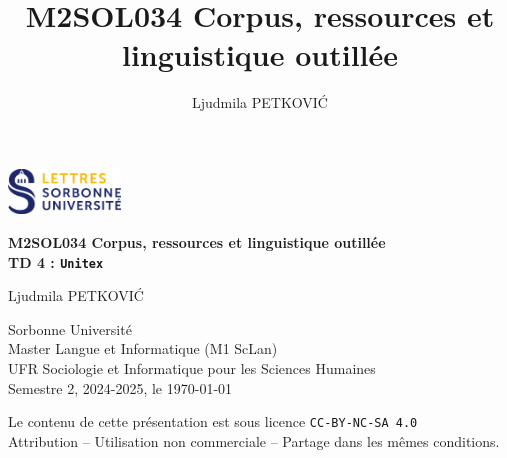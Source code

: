 \documentclass[xcolor={table,usenames,dvipsnames}]{article}
\author{Ljudmila PETKOVI\'C}
\title{\textbf{\textsc{M2SOL034} Corpus, ressources et linguistique outillée}}
\begin{document}
	
	\begin{center}
		\includegraphics[width=3cm]{img/logo.png} %
	\end{center}
	
	\begin{tcolorbox}[colback=myblue!10, colframe=myblue, width=\textwidth, sharp corners, boxrule=1pt]
		\centering
		\Large \textbf{\textsc{M2SOL034} Corpus, ressources et linguistique outillée\\{\large\textsc{TD 4} : \texttt{Unitex}}}
	\end{tcolorbox}
	
	\begin{center}
		Ljudmila PETKOVI\'C
		
		{\small Sorbonne Université\\Master \og{}Langue et Informatique\fg{} (\textsc{M1} ScLan)\\\textsc{UFR} Sociologie et Informatique pour les Sciences Humaines\\Semestre 2, 2024-2025, le \today}
		
		
		{\scriptsize Le contenu de cette présentation est sous licence \texttt{CC-BY-NC-SA 4.0}\\Attribution -- Utilisation non commerciale -- Partage dans les mêmes conditions.\\}
		\href{https://creativecommons.org/licenses/by-nc-sa/4.0/deed.fr}{\ccbyncsa}
	\end{center}
	
\hline

		
	\tableofcontents
	
	\bigskip
	
\end{document}
